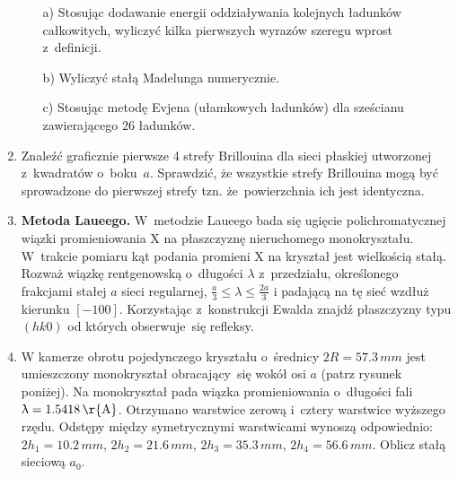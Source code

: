 \documentclass[a4paper,11pt]{article}
\begin{document}
\begin{enumerate}
  \begin{itemize}
  \item[a)] Stosując dodawanie energii oddziaływania kolejnych
    ładunków całkowitych, wyliczyć kilka pierwszych wyrazów szeregu
    wprost z~definicji.

  \item[b)] Wyliczyć stałą Madelunga numerycznie.

  \item[c)] Stosując metodę Evjena (ułamkowych ładunków) dla sześcianu
    zawierającego 26 ładunków.

  \end{itemize}

\item Znaleźć graficznie pierwsze 4 strefy Brillouina dla sieci
  płaskiej utworzonej z~kwadratów o~boku~$a$. Sprawdzić, że wszystkie
  strefy Brillouina mogą być sprowadzone do pierwszej strefy tzn.
  że~powierzchnia ich jest identyczna.

\item \textbf{Metoda Laueego.} W~metodzie Laueego bada się ugięcie
  polichromatycznej wiązki promieniowania X na płaszczyznę
  nieruchomego monokryształu. W~trakcie pomiaru kąt podania promieni X
  na kryształ jest wielkością stałą. Rozważ wiązkę rentgenowską
  o~długości $\lambda$ z~przedziału, określonego frakcjami stałej $a$ sieci
  regularnej, $\frac{ a }{ 3 } \leq \lambda \leq \frac{ 2a }{ 3 }$ i padającą na
  tę sieć wzdłuż kierunku $[-100]$. Korzystając z~konstrukcji Ewalda
  znajdź płaszczyzny typu $(hk0)$ od których obserwuje~się refleksy.

\item W kamerze obrotu pojedynczego kryształu o~średnicy
  $2R = 57.3 \, \si{mm}$ jest umieszczony monokryształ obracający~się
  wokół osi $a$ (patrz rysunek poniżej). Na monokryształ pada wiązka
  promieniowania o~długości fali $\lambda = 1.5418 \, \si{\r{A}}$. Otrzymano
  warstwice zerową i~cztery warstwice wyższego rzędu. Odstępy między
  symetrycznymi warstwicami wynoszą odpowiednio:
  $2 h_{ 1 } = 10.2 \, \si{mm}$, $2 h_{ 2 } = 21.6 \, \si{mm}$,
  $2 h_{ 3 } = 35.3 \, \si{mm}$, $2 h_{ 4 } = 56.6 \, \si{mm}$. Oblicz
  stałą sieciową $a_{ 0 }$.











\end{enumerate}
\end{document}
